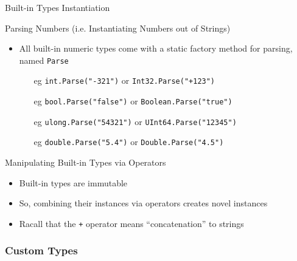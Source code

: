 \documentclass[presentation]{beamer}
\begin{document}
\begin{frame}[allowframebreaks]{Built-in Types Instantiation}
    \begin{exampleblock}{Parsing Numbers (i.e. Instantiating Numbers out of Strings)}
        \begin{itemize}
            \item All built-in numeric types come with a \alert{static factory method} for parsing, named \texttt{Parse}
            \begin{itemize}
                \item[eg] \texttt{int.Parse("-321")} or \texttt{Int32.Parse("+123")}
                \item[eg] \texttt{bool.Parse("false")} or \texttt{Boolean.Parse("true")}
                \item[eg] \texttt{ulong.Parse("54321")} or \texttt{UInt64.Parse("12345")} 
                \item[eg] \texttt{double.Parse("5.4")} or \texttt{Double.Parse("4.5")}  
            \end{itemize}
        \end{itemize}
    \end{exampleblock}

    \begin{block}{Manipulating Built-in Types via Operators}
        \begin{itemize}
            \item Built-in types are \alert{immutable}
            \item So, combining their instances via operators creates novel instances 
            \item Racall that the \texttt{+} operator means ``concatenation'' to strings
        \end{itemize}
    \end{block}
\end{frame}

\subsubsection{Custom Types}
\end{document}
